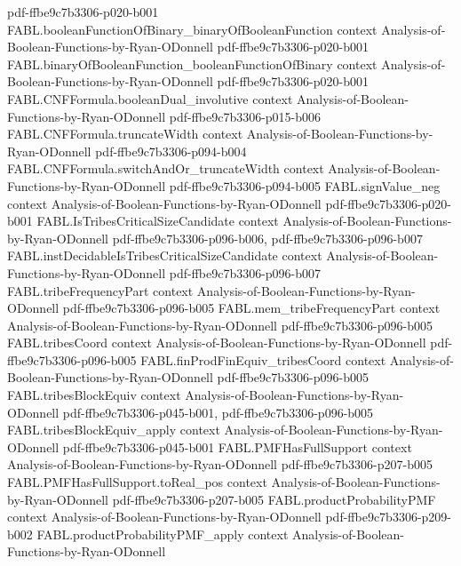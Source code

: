 \begin{theorem}
  {pdf-ffbe9c7b3306-p020-b001}
\proofstep
  {FABL.booleanFunctionOfBinary_binaryOfBooleanFunction}
  {context}
  {Analysis-of-Boolean-Functions-by-Ryan-ODonnell}
  {pdf-ffbe9c7b3306-p020-b001}
\proofstep
  {FABL.binaryOfBooleanFunction_booleanFunctionOfBinary}
  {context}
  {Analysis-of-Boolean-Functions-by-Ryan-ODonnell}
  {pdf-ffbe9c7b3306-p020-b001}
\proofstep
  {FABL.CNFFormula.booleanDual_involutive}
  {context}
  {Analysis-of-Boolean-Functions-by-Ryan-ODonnell}
  {pdf-ffbe9c7b3306-p015-b006}
\proofstep
  {FABL.CNFFormula.truncateWidth}
  {context}
  {Analysis-of-Boolean-Functions-by-Ryan-ODonnell}
  {pdf-ffbe9c7b3306-p094-b004}
\proofstep
  {FABL.CNFFormula.switchAndOr_truncateWidth}
  {context}
  {Analysis-of-Boolean-Functions-by-Ryan-ODonnell}
  {pdf-ffbe9c7b3306-p094-b005}
\proofstep
  {FABL.signValue_neg}
  {context}
  {Analysis-of-Boolean-Functions-by-Ryan-ODonnell}
  {pdf-ffbe9c7b3306-p020-b001}
\proofstep
  {FABL.IsTribesCriticalSizeCandidate}
  {context}
  {Analysis-of-Boolean-Functions-by-Ryan-ODonnell}
  {pdf-ffbe9c7b3306-p096-b006,
    pdf-ffbe9c7b3306-p096-b007}
\proofstep
  {FABL.instDecidableIsTribesCriticalSizeCandidate}
  {context}
  {Analysis-of-Boolean-Functions-by-Ryan-ODonnell}
  {pdf-ffbe9c7b3306-p096-b007}
\proofstep
  {FABL.tribeFrequencyPart}
  {context}
  {Analysis-of-Boolean-Functions-by-Ryan-ODonnell}
  {pdf-ffbe9c7b3306-p096-b005}
\proofstep
  {FABL.mem_tribeFrequencyPart}
  {context}
  {Analysis-of-Boolean-Functions-by-Ryan-ODonnell}
  {pdf-ffbe9c7b3306-p096-b005}
\proofstep
  {FABL.tribesCoord}
  {context}
  {Analysis-of-Boolean-Functions-by-Ryan-ODonnell}
  {pdf-ffbe9c7b3306-p096-b005}
\proofstep
  {FABL.finProdFinEquiv_tribesCoord}
  {context}
  {Analysis-of-Boolean-Functions-by-Ryan-ODonnell}
  {pdf-ffbe9c7b3306-p096-b005}
\proofstep
  {FABL.tribesBlockEquiv}
  {context}
  {Analysis-of-Boolean-Functions-by-Ryan-ODonnell}
  {pdf-ffbe9c7b3306-p045-b001,
    pdf-ffbe9c7b3306-p096-b005}
\proofstep
  {FABL.tribesBlockEquiv_apply}
  {context}
  {Analysis-of-Boolean-Functions-by-Ryan-ODonnell}
  {pdf-ffbe9c7b3306-p045-b001}
\proofstep
  {FABL.PMFHasFullSupport}
  {context}
  {Analysis-of-Boolean-Functions-by-Ryan-ODonnell}
  {pdf-ffbe9c7b3306-p207-b005}
\proofstep
  {FABL.PMFHasFullSupport.toReal_pos}
  {context}
  {Analysis-of-Boolean-Functions-by-Ryan-ODonnell}
  {pdf-ffbe9c7b3306-p207-b005}
\proofstep
  {FABL.productProbabilityPMF}
  {context}
  {Analysis-of-Boolean-Functions-by-Ryan-ODonnell}
  {pdf-ffbe9c7b3306-p209-b002}
\proofstep
  {FABL.productProbabilityPMF_apply}
  {context}
  {Analysis-of-Boolean-Functions-by-Ryan-ODonnell}

\end{theorem}
